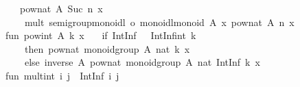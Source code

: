 \begin{isabellebody}
\begin{isamarkuptext}
\ \ {}\ pow{}nat\ A{}\ {}Suc\ n{}\ x\ {}\isanewline
\ \ \ \ mult\ {}{}semigroup{}monoidl\ o\ monoidl{}monoid{}\ A{}{}\ x\ {}pow{}nat\ A{}\ n\ x{}{}\isanewline
\isanewline
fun\ pow{}int\ A{}\ k\ x\ {}\isanewline
\ \ {}if\ IntInf{}{}{}\ {}{}{}\ {}\ IntInf{}int{}{}\ k{}\isanewline
\ \ \ \ then\ pow{}nat\ {}monoid{}group\ A{}{}\ {}nat\ k{}\ x\isanewline
\ \ \ \ else\ inverse\ A{}\ {}pow{}nat\ {}monoid{}group\ A{}{}\ {}nat\ {}IntInf{}{}\ k{}{}\ x{}{}{}\isanewline
\isanewline
fun\ mult{}int\ i\ j\ {}\ IntInf{}{}\ {}i{}\ j{}{}\isanewline

\end{isamarkuptext}
\end{isabellebody}
